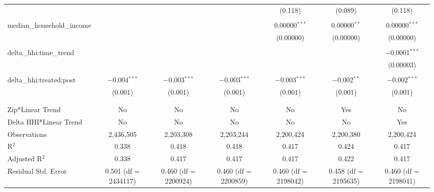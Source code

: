 \begin{table}[H]
{\begin{tabular}{@{\extracolsep{5pt}}lcccccc}
   &  &  &  & (0.118) & (0.089) & (0.118) \\  

   & & & & & & \\  

  median\_household\_income &  &  &  & 0.00000$^{***}$ & 0.00000$^{**}$ & 0.00000$^{***}$ \\  

   &  &  &  & (0.00000) & (0.00000) & (0.00000) \\  

   & & & & & & \\  

  delta\_hhi:time\_trend &  &  &  &  &  & $-$0.0001$^{***}$ \\  

   &  &  &  &  &  & (0.00003) \\  

   & & & & & & \\  

  delta\_hhi:treated:post & $-$0.004$^{***}$ & $-$0.003$^{***}$ & $-$0.003$^{***}$ & $-$0.003$^{***}$ & $-$0.002$^{**}$ & $-$0.002$^{***}$ \\  

   & (0.001) & (0.001) & (0.001) & (0.001) & (0.001) & (0.001) \\  

   & & & & & & \\  

 \hline \\[-1.8ex]  

 Zip*Linear Trend & No & No & No & No & Yes & No \\  

 Delta HHI*Linear Trend & No & No & No & No & No & Yes \\  

 Observations & 2,436,505 & 2,203,308 & 2,203,244 & 2,200,424 & 2,200,380 & 2,200,424 \\  

 R$^{2}$ & 0.338 & 0.418 & 0.418 & 0.417 & 0.424 & 0.417 \\  

 Adjusted R$^{2}$ & 0.338 & 0.417 & 0.417 & 0.417 & 0.422 & 0.417 \\  

 Residual Std. Error & 0.501 (df = 2434117) & 0.460 (df = 2200924) & 0.460 (df = 2200859) & 0.460 (df = 2198042) & 0.458 (df = 2195635) & 0.460 (df = 2198041) \\  

 \hline  


\end{tabular}}
\end{table}

